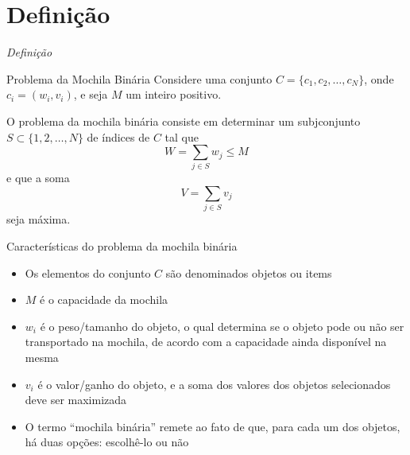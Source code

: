 \section{Definição}

\begin{frame}[fragile]{{\it Definição}}

    \begin{block}{Problema da Mochila Binária}
        Considere uma conjunto $C = \{ c_1, c_2, \ldots, c_N \}$, onde $c_i = (w_i, v_i)$,
        e seja $M$ um inteiro positivo.

        O problema da mochila binária consiste em determinar um subjconjunto $S\subset 
        \{ 1, 2, \ldots, N \}$ de índices de $C$ tal que
        \[
            W = \sum_{j\in S} w_j \leq M
        \]
        e que a soma
        \[
            V = \sum_{j \in S} v_j
        \] seja máxima.
    \end{block}

\end{frame}

\begin{frame}[fragile]{Características do problema da mochila binária}

    \begin{itemize}
        \item Os elementos do conjunto $C$ são denominados objetos ou items

        \item $M$ é o capacidade da mochila

        \item $w_i$ é o peso/tamanho do objeto, o qual determina se o objeto pode ou não ser
            transportado na mochila, de acordo com a capacidade ainda disponível na mesma

        \item $v_i$ é o valor/ganho do objeto, e a soma dos valores dos objetos selecionados
            deve ser maximizada

        \item O termo ``mochila binária'' remete ao fato de que, para cada um dos objetos,
            há duas opções: escolhê-lo ou não
    \end{itemize}

\end{frame}

